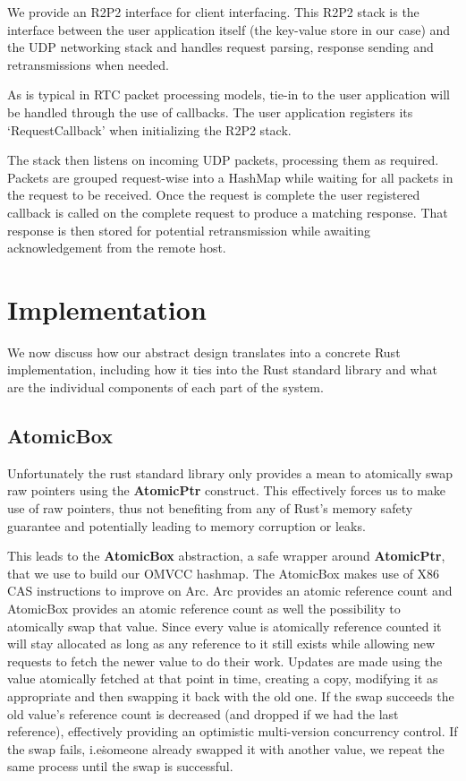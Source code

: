 \documentclass[11pt]{article}
\begin{document}
We provide an R2P2 interface for client interfacing. This R2P2 stack
is the interface between the user application itself (the key-value
store in our case) and the UDP networking stack and handles request
parsing, response sending and retransmissions when needed.

As is typical in RTC packet processing models, tie-in to the user
application will be handled through the use of callbacks. The user
application registers its `RequestCallback' when initializing the R2P2
stack.

The stack then listens on incoming UDP packets, processing them as
required. Packets are grouped request-wise into a HashMap while
waiting for all packets in the request to be received. Once the
request is complete the user registered callback is called on the
complete request to produce a matching response. That response is then
stored for potential retransmission while awaiting acknowledgement
from the remote host.

\section{Implementation}

We now discuss how our abstract design translates into a concrete Rust
implementation, including how it ties into the Rust standard library
and what are the individual components of each part of the system.

\subsection{AtomicBox}

Unfortunately the rust standard library only provides a mean to
atomically swap raw pointers using the \textbf{AtomicPtr}
construct. This effectively forces us to make use of raw pointers,
thus not benefiting from any of Rust's memory safety guarantee and
potentially leading to memory corruption or leaks.

This leads to the \textbf{AtomicBox} abstraction, a safe wrapper
around \textbf{AtomicPtr}, that we use to build our OMVCC hashmap.
The AtomicBox makes use of X86 CAS instructions to improve on Arc.
Arc provides an atomic reference count and AtomicBox provides an
atomic reference count as well the possibility to atomically swap that
value. Since every value is atomically reference counted it will stay
allocated as long as any reference to it still exists while allowing
new requests to fetch the newer value to do their work. Updates are
made using the value atomically fetched at that point in time,
creating a copy, modifying it as appropriate and then swapping it back
with the old one. If the swap succeeds the old value's reference count
is decreased (and dropped if we had the last reference), effectively
providing an optimistic multi-version concurrency control. If the swap
fails, i.e\. someone already swapped it with another value, we repeat
the same process until the swap is successful.
\end{document}
